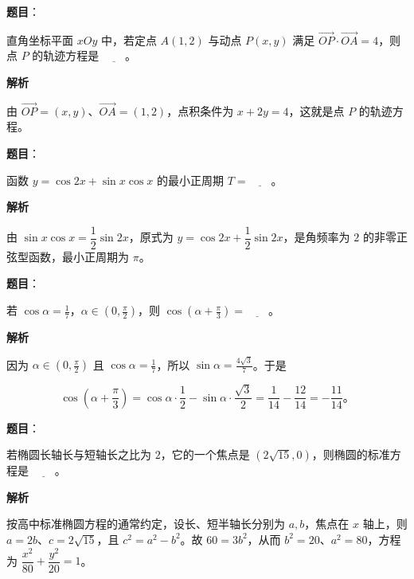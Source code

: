 \begin{answer}

\textbf{题目}：

直角坐标平面 $xOy$ 中，若定点 $A(1,2)$ 与动点 $P(x,y)$ 满足 $\overrightarrow{OP}\cdot\overrightarrow{OA}=4$，则点 $P$ 的轨迹方程是 $\underline{\qquad}$。

\textbf{解析}

由 $\overrightarrow{OP}=(x,y)$、$\overrightarrow{OA}=(1,2)$，点积条件为 $x+2y=4$，这就是点 $P$ 的轨迹方程。


\end{answer}
\begin{answer}

\textbf{题目}：

函数 $y=\cos 2x+\sin x\cos x$ 的最小正周期 $T=\underline{\qquad}$。

\textbf{解析}

由 $\sin x\cos x=\dfrac12\sin2x$，原式为 $y=\cos2x+\dfrac12\sin2x$，是角频率为 $2$ 的非零正弦型函数，最小正周期为 $\pi$。


\end{answer}
\begin{answer}

\textbf{题目}：

若 $\cos\alpha=\frac17$，$\alpha\in\left(0,\frac\pi2\right)$，则 $\cos\left(\alpha+\frac\pi3\right)=\underline{\qquad}$。

\textbf{解析}

因为 $\alpha\in(0,\frac\pi2)$ 且 $\cos\alpha=\frac17$，所以 $\sin\alpha=\frac{4\sqrt3}{7}$。于是

\nopagebreak[4]
\[
\cos\left(\alpha+\frac\pi3\right)
=\cos\alpha\cdot\frac12-\sin\alpha\cdot\frac{\sqrt3}{2}
=\frac1{14}-\frac{12}{14}=-\frac{11}{14}\mbox{。}
\]


\end{answer}
\begin{answer}

\textbf{题目}：

若椭圆长轴长与短轴长之比为 $2$，它的一个焦点是 $(2\sqrt{15},0)$，则椭圆的标准方程是 $\underline{\qquad}$。

\textbf{解析}

按高中标准椭圆方程的通常约定，设长、短半轴长分别为 $a,b$，焦点在 $x$ 轴上，则 $a=2b$、$c=2\sqrt{15}$，且 $c^2=a^2-b^2$。故 $60=3b^2$，从而 $b^2=20$、$a^2=80$，方程为 $\dfrac{x^2}{80}+\dfrac{y^2}{20}=1$。


\end{answer}
